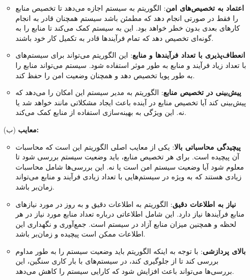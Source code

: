 \begin{qsolve}
	\begin{enumerate}
		\item [ ]
		\begin{itemize}
			
			\item \textbf{اعتماد به تخصیص‌های امن}: الگوریتم به سیستم اجازه می‌دهد تا تخصیص منابع را فقط در صورتی انجام دهد که مطمئن باشد سیستم همچنان قادر به انجام کارهای بعدی بدون خطر  خواهد بود. این به سیستم کمک می‌کند تا منابع را به گونه‌ای تخصیص دهد که تمام فرآیندها قادر به تکمیل کار خود باشند.
			
			\item \textbf{انعطاف‌پذیری با تعداد فرآیندها و منابع}: این الگوریتم می‌تواند برای سیستم‌های با تعداد زیاد فرآیند و منابع به طور موثر استفاده شود. سیستم می‌تواند منابع را به طور پویا تخصیص دهد و همچنان وضعیت امن را حفظ کند.
			
			\item \textbf{پیش‌بینی در تخصیص منابع}: الگوریتم  به مدیر سیستم این امکان را می‌دهد که پیش‌بینی کند آیا تخصیص منابع در آینده باعث ایجاد مشکلاتی مانند  خواهد شد یا نه. این ویژگی به بهینه‌سازی استفاده از منابع کمک می‌کند.
			
		\end{itemize}
		
		\item [(ب)] \textbf{معایب: }
		\begin{itemize}
			\item \textbf{پیچیدگی محاسباتی بالا}: یکی از معایب اصلی الگوریتم  این است که محاسبات آن پیچیده است. برای هر تخصیص منابع، باید وضعیت سیستم بررسی شود تا معلوم شود آیا وضعیت سیستم امن است یا نه. این بررسی‌ها شامل محاسبات زیادی هستند که به ویژه در سیستم‌هایی با تعداد زیادی فرآیند و منابع می‌تواند زمان‌بر باشد.
			
			\item \textbf{نیاز به اطلاعات دقیق}: الگوریتم  به اطلاعات دقیق و به روز در مورد نیازهای منابع فرآیندها نیاز دارد. این شامل اطلاعاتی درباره تعداد منابع مورد نیاز در هر لحظه و همچنین میزان منابع آزاد در سیستم است. جمع‌آوری و نگهداری این اطلاعات ممکن است پیچیده و زمان‌بر باشد.
			
			\item \textbf{ بالای پردازشی}: با توجه به اینکه الگوریتم باید وضعیت سیستم را به طور مداوم بررسی کند تا از  جلوگیری کند، در سیستم‌های با بار کاری سنگین، این بررسی‌ها می‌تواند باعث افزایش  شود که کارایی سیستم را کاهش می‌دهد.
			

\end{itemize}
\end{enumerate}
\end{qsolve}
